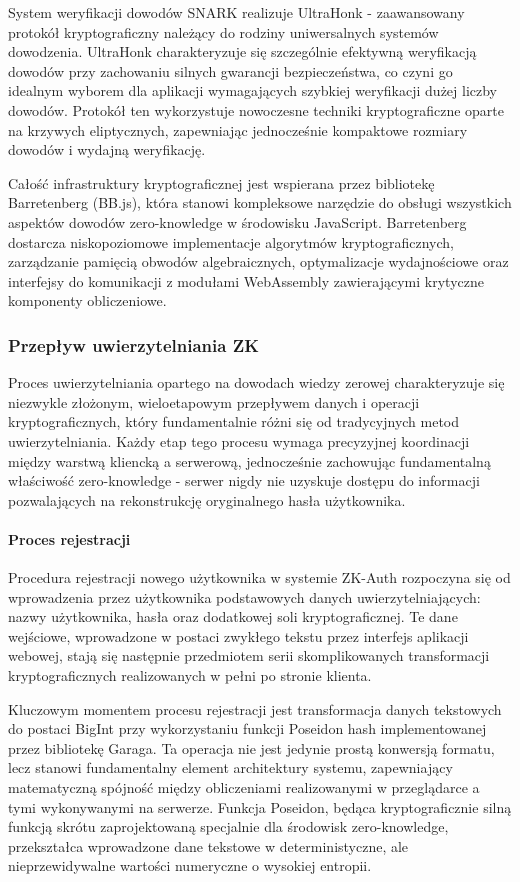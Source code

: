 \documentclass{article}
\begin{document}
System weryfikacji dowodów SNARK realizuje UltraHonk - zaawansowany protokół kryptograficzny należący do rodziny uniwersalnych systemów dowodzenia. UltraHonk charakteryzuje się szczególnie efektywną weryfikacją dowodów przy zachowaniu silnych gwarancji bezpieczeństwa, co czyni go idealnym wyborem dla aplikacji wymagających szybkiej weryfikacji dużej liczby dowodów. Protokół ten wykorzystuje nowoczesne techniki kryptograficzne oparte na krzywych eliptycznych, zapewniając jednocześnie kompaktowe rozmiary dowodów i wydajną weryfikację.

Całość infrastruktury kryptograficznej jest wspierana przez bibliotekę Barretenberg (BB.js), która stanowi kompleksowe narzędzie do obsługi wszystkich aspektów dowodów zero-knowledge w środowisku JavaScript. Barretenberg dostarcza niskopoziomowe implementacje algorytmów kryptograficznych, zarządzanie pamięcią obwodów algebraicznych, optymalizacje wydajnościowe oraz interfejsy do komunikacji z modułami WebAssembly zawierającymi krytyczne komponenty obliczeniowe.

\subsubsection{Przepływ uwierzytelniania ZK}
Proces uwierzytelniania opartego na dowodach wiedzy zerowej charakteryzuje się niezwykle złożonym, wieloetapowym przepływem danych i operacji kryptograficznych, który fundamentalnie różni się od tradycyjnych metod uwierzytelniania. Każdy etap tego procesu wymaga precyzyjnej koordinacji między warstwą kliencką a serwerową, jednocześnie zachowując fundamentalną właściwość zero-knowledge - serwer nigdy nie uzyskuje dostępu do informacji pozwalających na rekonstrukcję oryginalnego hasła użytkownika.

\paragraph{Proces rejestracji}
Procedura rejestracji nowego użytkownika w systemie ZK-Auth rozpoczyna się od wprowadzenia przez użytkownika podstawowych danych uwierzytelniających: nazwy użytkownika, hasła oraz dodatkowej soli kryptograficznej. Te dane wejściowe, wprowadzone w postaci zwykłego tekstu przez interfejs aplikacji webowej, stają się następnie przedmiotem serii skomplikowanych transformacji kryptograficznych realizowanych w pełni po stronie klienta.

Kluczowym momentem procesu rejestracji jest transformacja danych tekstowych do postaci BigInt przy wykorzystaniu funkcji Poseidon hash implementowanej przez bibliotekę Garaga. Ta operacja nie jest jedynie prostą konwersją formatu, lecz stanowi fundamentalny element architektury systemu, zapewniający matematyczną spójność między obliczeniami realizowanymi w przeglądarce a tymi wykonywanymi na serwerze. Funkcja Poseidon, będąca kryptograficznie silną funkcją skrótu zaprojektowaną specjalnie dla środowisk zero-knowledge, przekształca wprowadzone dane tekstowe w deterministyczne, ale nieprzewidywalne wartości numeryczne o wysokiej entropii.
\end{document}
